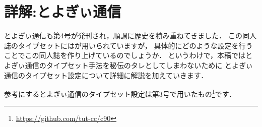 \newcommand*{\reflisting}[1]{\lstlistingname\ \ref{#1}}
\renewcommand*\descriptionlabel[1]{\normalfont\headfont #1 :\hfil}
\newcommand*{\jyquote}[1]{“#1”}

\chapter{詳解:とよぎぃ通信}

とよぎぃ通信も第4号が発刊され，順調に歴史を積み重ねてきました．
この同人誌のタイプセットには{\pLaTeX}が用いられていますが，
具体的にどのような設定を行うことでこの同人誌を作り上げているのでしょうか．
というわけで，本稿ではとよぎぃ通信のタイプセット手法を秘伝のタレとしてしまわないために
とよぎぃ通信のタイプセット設定について詳細に解説を加えていきます．

参考にするとよぎぃ通信のタイプセット設定は第3号で用いたもの\footnote{\url{https://github.com/tut-cc/c90}}です．

